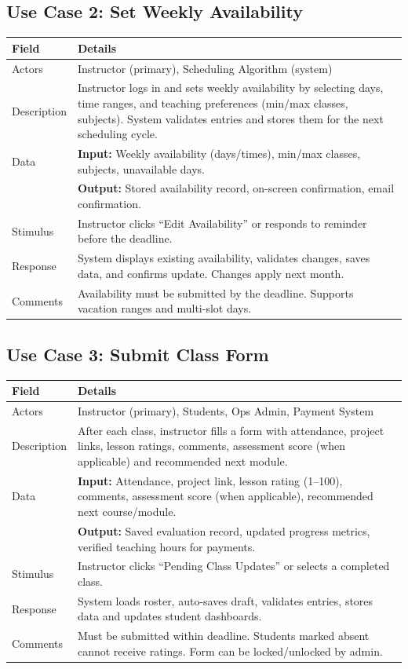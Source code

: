\subsection{Use Case 2: Set Weekly Availability}

\begin{tabular}{|p{3.5cm}|p{11cm}|}
\hline
\textbf{Field} & \textbf{Details} \\ \hline
Actors & Instructor (primary), Scheduling Algorithm (system) \\ \hline
Description & Instructor logs in and sets weekly availability by selecting days, time ranges, and teaching preferences (min/max classes, subjects). System validates entries and stores them for the next scheduling cycle. \\ \hline
Data & \textbf{Input:} Weekly availability (days/times), min/max classes, subjects, unavailable days. \\
& \textbf{Output:} Stored availability record, on-screen confirmation, email confirmation. \\ \hline
Stimulus & Instructor clicks ``Edit Availability'' or responds to reminder before the deadline. \\ \hline
Response & System displays existing availability, validates changes, saves data, and confirms update. Changes apply next month. \\ \hline
Comments & Availability must be submitted by the deadline. Supports vacation ranges and multi-slot days. \\ \hline
\end{tabular}

\subsection{Use Case 3: Submit Class Form}

\begin{tabular}{|p{3.5cm}|p{11cm}|}
\hline
\textbf{Field} & \textbf{Details} \\ \hline
Actors & Instructor (primary), Students, Ops Admin, Payment System \\ \hline
Description & After each class, instructor fills a form with attendance, project links, lesson ratings, comments, assessment score (when applicable) and recommended next module. \\ \hline
Data & \textbf{Input:} Attendance, project link, lesson rating (1--100), comments, assessment score (when applicable), recommended next course/module. \\
& \textbf{Output:} Saved evaluation record, updated progress metrics, verified teaching hours for payments. \\ \hline
Stimulus & Instructor clicks ``Pending Class Updates'' or selects a completed class. \\ \hline
Response & System loads roster, auto-saves draft, validates entries, stores data and updates student dashboards. \\ \hline
Comments & Must be submitted within deadline. Students marked absent cannot receive ratings. Form can be locked/unlocked by admin. \\ \hline
\end{tabular}


